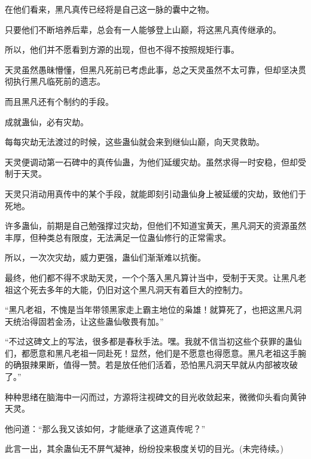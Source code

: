 \begin{this_body}
在他们看来，黑凡真传已经将是自己这一脉的囊中之物。

只要他们不断培养后辈，总会有一人能够登上山巅，将这黑凡真传继承的。

所以，他们并不愿看到方源的出现，但也不得不按照规矩行事。

天灵虽然愚昧懵懂，但黑凡死前已考虑此事，总之天灵虽然不太可靠，但却坚决贯彻执行黑凡临死前的遗志。

而且黑凡还有个制约的手段。

成就蛊仙，必有灾劫。

每每灾劫无法渡过的时候，这些蛊仙就会来到继仙山巅，向天灵救助。

天灵便调动第一石碑中的真传仙蛊，为他们延缓灾劫。虽然求得一时安稳，但却受制于天灵。

天灵只消动用真传中的某个手段，就能即刻引动蛊仙身上被延缓的灾劫，致他们于死地。

许多蛊仙，前期是自己勉强撑过灾劫，但他们不知道宝黄天，黑凡洞天的资源虽然丰厚，但种类总有限度，无法满足一位蛊仙修行的正常需求。

所以，一次次灾劫，威力更强，蛊仙们渐渐难以抗衡。

最终，他们都不得不求助天灵，一个个落入黑凡算计当中，受制于天灵。让黑凡老祖这个死去多年的大能，仍旧对这个黑凡洞天有着巨大的控制力。

“黑凡老祖，不愧是当年带领黑家走上霸主地位的枭雄！就算死了，也把这黑凡洞天统治得固若金汤，让这些蛊仙敬畏有加。”

“不过这碑文上的写法，很多都是春秋手法。嘿。我就不信当初这些个获罪的蛊仙们，都愿意和黑凡老祖一同赴死！显然，他们是不愿意也得愿意。黑凡老祖这手腕的确狠辣果断，值得一赞。若是放任他们活着，恐怕黑凡洞天早就从内部被攻破了。”

种种思绪在脑海中一闪而过，方源将注视碑文的目光收敛起来，微微仰头看向黄钟天灵。

他问道：“那么我又该如何，才能继承了这道真传呢？”

此言一出，其余蛊仙无不屏气凝神，纷纷投来极度关切的目光。(未完待续。)

\end{this_body}

